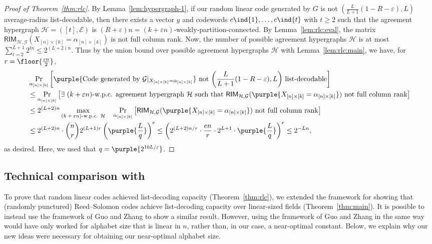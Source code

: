 \documentclass{article}[11pt]
\begin{document}
\begin{proof}[Proof of Theorem~\ref{thm:rlc}]
By Lemma~\ref{lem:hypergraph-1}, if our random linear code generated by $G$ is not $\left(\frac{L}{L+1}(1-R-\varepsilon),L\right)$ average-radius list-decodable, then there exists a vector $y$ and codewords $c\ind{1},\dots,c\ind{t}$ with $t \ge 2$ such that the agreement hypergraph $\mathcal{H} = ([t], \mathcal{E})$ is $(R+\varepsilon)n = (k+\varepsilon n)$-weakly-partition-connected. By Lemma~\ref{lem:rlc:eval}, the matrix $\mathsf{RIM}_{\mathcal{H},\mathcal{G}}(X_{[n]\times [k]}=\alpha_{[n]\times [k]})$ is not full column rank. 
  Now, the number of possible agreement hypergraphs $\mathcal{H}$ is at most $\sum_{t=2}^{L+1} 2^{tn} \le 2^{(L+2)n}$.
  Thus by the union bound over possible agreement hypergraphs $\mathcal{H}$ with Lemma~\ref{lem:rlc:main}, we have, for $r= \floor{\frac{\varepsilon n}{2}}$,
  \begin{align}
    &\Pr_{\alpha_{[n]\times [k]}}\left[ \purple{\text{Code generated by }\mathcal{G}|_{X_{[n]\times [k]}=\alpha_{[n]\times [k]}}} \text{ not $\left(\frac{L}{L+1}(1-R-\varepsilon),L\right)$ list-decodable} \right] \nonumber\\
    &\le \Pr_{\alpha_{[n]\times [k]}}\left[ \exists \text{ $(k+\varepsilon n)$-w.p.c. agreement hypergraph } \mathcal{H} \text{ such that } \mathsf{RIM}_{\mathcal{H},\mathcal{G}}(\purple{X_{[n]\times [k]}=\alpha_{[n]\times [k]}}) \text{ not full column rank}\right] \nonumber\\
    &\le 2^{(L+2)n} \max_{\text{$(k+\varepsilon n)$-w.p.c. }\mathcal{H}}\quad\Pr_{\alpha_{[n]\times [k]}}\left[ \mathsf{RIM}_{\mathcal{H},\mathcal{G}}(\purple{X_{[n]\times [k]}=\alpha_{[n]\times [k]}}) \text{ not full column rank}\right] \nonumber\\
    &\le 2^{(L+2)n} \cdot \binom{n}{r} 2^{(L+1)r} \left( \purple{\frac{L}{q}} \right)^r 
    \le \left( 2^{(L+2)n/r}\cdot \frac{e n}{r}\cdot 2^{L+1} \cdot \purple{\frac{L}{q}} \right)^r 
    \le 2^{-Ln},
    \label{eq:rlc-prob}
  \end{align}
  as desired.
  Here, we used that $q = \purple{2^{10L/\varepsilon}}$.
\end{proof}


\subsection{Technical comparison with \cite{GZ23}}
\label{ssec:compare}

To prove that random linear codes achieved list-decoding capacity (Theorem~\ref{thm:rlc}), we extended the framework for showing that (randomly punctured) Reed--Solomon codes achieve list-decoding capacity over linear-sized fields (Theorem~\ref{thm:main}).
It is possible to instead use the framework of Guo and Zhang \cite{GZ23} to show a similar result.
However, using the framework of Guo and Zhang in the same way would have only worked for alphabet size that is linear in $n$, rather than, in our case, a near-optimal constant.
Below, we explain why our new ideas were necessary for obtaining our near-optimal alphabet size.
\end{document}
